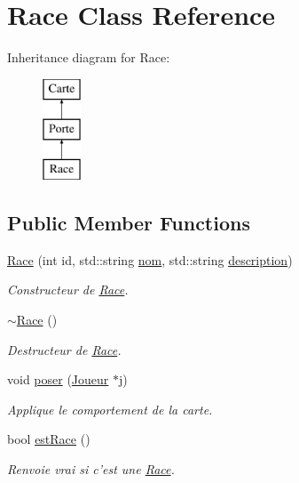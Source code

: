 \hypertarget{class_race}{\section{Race Class Reference}
\label{class_race}
}
Inheritance diagram for Race\-:\begin{figure}[H]
\begin{center}
\leavevmode
\includegraphics[height=3.000000cm]{class_race}
\end{center}
\end{figure}
\subsection*{Public Member Functions}
\begin{DoxyCompactItemize}
\item 
\hyperlink{class_race_a0df40698a7c2542ab077d3c656e13fab}{Race} (int id, std\-::string \hyperlink{class_carte_a46bff2b84b76b6b94b2eaa3fe813ec69}{nom}, std\-::string \hyperlink{class_carte_a5f2acc07fa281fb6d4467c00bd4b1614}{description})
\begin{DoxyCompactList}\small\item\em Constructeur de \hyperlink{class_race}{Race}. \end{DoxyCompactList}\item 
\hypertarget{class_race_ad6bfb0bc96485e23b3bf45d794b5b536}{\hyperlink{class_race_ad6bfb0bc96485e23b3bf45d794b5b536}{$\sim$\-Race} ()}\label{class_race_ad6bfb0bc96485e23b3bf45d794b5b536}

\begin{DoxyCompactList}\small\item\em Destructeur de \hyperlink{class_race}{Race}. \end{DoxyCompactList}\item 
\hypertarget{class_race_a2f6e239a9ef0271c376660e692a553db}{void \hyperlink{class_race_a2f6e239a9ef0271c376660e692a553db}{poser} (\hyperlink{class_joueur}{Joueur} $\ast$j)}\label{class_race_a2f6e239a9ef0271c376660e692a553db}

\begin{DoxyCompactList}\small\item\em Applique le comportement de la carte. \end{DoxyCompactList}\item 
bool \hyperlink{class_race_a4d583fa670a0c3666715b89f86935060}{est\-Race} ()
\begin{DoxyCompactList}\small\item\em Renvoie vrai si c'est une \hyperlink{class_race}{Race}. \end{DoxyCompactList}\end{DoxyCompactItemize}
